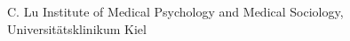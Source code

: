
                {C. Lu}
                {Institute of Medical Psychology and Medical Sociology, Universitätsklinikum Kiel}
                